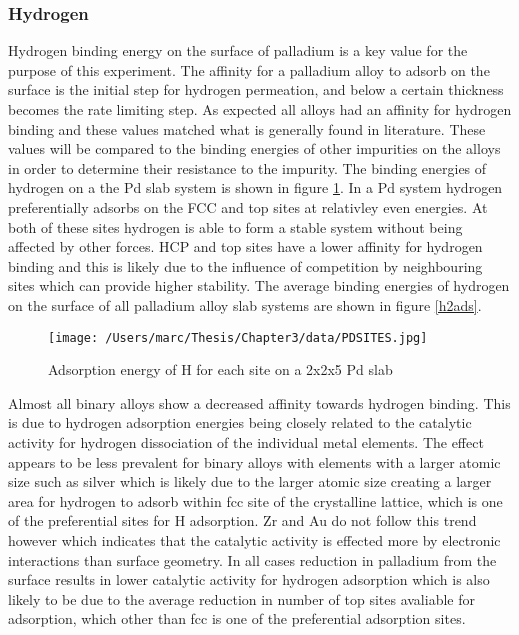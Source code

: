 \subsubsection{Hydrogen}
Hydrogen binding energy on the surface of palladium is a key value for the purpose of this experiment. The affinity for a palladium alloy to adsorb on the surface is the initial step for hydrogen permeation, and below a certain thickness becomes the rate limiting step. As expected all alloys had an affinity for hydrogen binding and these values matched what is generally found in literature. These values will be compared to the binding energies of other impurities on the alloys in order to determine their resistance to the impurity. The binding energies of hydrogen on a the Pd slab system is shown in figure \ref{Pdsite}. In a Pd system hydrogen preferentially adsorbs on the FCC and top sites at relativley even energies. At both of these sites hydrogen is able to form a stable system without being affected by other forces. HCP and top sites have a  lower affinity for hydrogen binding and this is likely due to the influence of competition by neighbouring sites which can provide higher stability. The average binding energies of hydrogen on the surface of all palladium alloy slab systems are shown in figure \ref{h2ads}.

\begin{figure}
  \centering
  \texttt{[image: /Users/marc/Thesis/Chapter3/data/PDSITES.jpg]}
  \caption{Adsorption energy of H for each site on a 2x2x5 Pd slab}
  \label{Pdsite}
\end{figure}

Almost all binary alloys show a decreased affinity towards hydrogen binding. This is due to hydrogen adsorption energies being closely related to the catalytic activity for hydrogen dissociation of the individual metal elements. The effect appears to be less prevalent for binary alloys with elements with a larger atomic size such as silver which is likely due to the larger atomic size creating a larger area for hydrogen to adsorb within fcc site of the crystalline lattice, which is one of the preferential sites for H adsorption. Zr and Au do not follow this trend however which indicates that the catalytic activity is effected more by electronic interactions than surface geometry. In all cases reduction in palladium from the surface results in lower catalytic activity for hydrogen adsorption which is also likely to be due to the average reduction in number of top sites avaliable for adsorption, which other than fcc is one of the preferential adsorption sites. 

